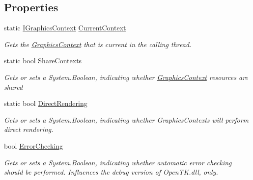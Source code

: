\subsection*{Properties}
\begin{DoxyCompactItemize}
\item 
static \hyperlink{interface_open_t_k_1_1_graphics_1_1_i_graphics_context}{I\-Graphics\-Context} \hyperlink{class_open_t_k_1_1_graphics_1_1_graphics_context_aa6b95167a8733355270dbb5d7c319986}{Current\-Context}
\begin{DoxyCompactList}\small\item\em Gets the \hyperlink{class_open_t_k_1_1_graphics_1_1_graphics_context}{Graphics\-Context} that is current in the calling thread. \end{DoxyCompactList}\item 
static bool \hyperlink{class_open_t_k_1_1_graphics_1_1_graphics_context_a83e5259c2dd10556b3c485f2e8a00494}{Share\-Contexts}
\begin{DoxyCompactList}\small\item\em Gets or sets a System.\-Boolean, indicating whether \hyperlink{class_open_t_k_1_1_graphics_1_1_graphics_context}{Graphics\-Context} resources are shared\end{DoxyCompactList}\item 
static bool \hyperlink{class_open_t_k_1_1_graphics_1_1_graphics_context_a2c0431903a5da942e015be0847f070bb}{Direct\-Rendering}
\begin{DoxyCompactList}\small\item\em Gets or sets a System.\-Boolean, indicating whether Graphics\-Contexts will perform direct rendering.\end{DoxyCompactList}\item 
bool \hyperlink{class_open_t_k_1_1_graphics_1_1_graphics_context_a8ad06302403c5503b6ba954676523d90}{Error\-Checking}
\begin{DoxyCompactList}\small\item\em Gets or sets a System.\-Boolean, indicating whether automatic error checking should be performed. Influences the debug version of Open\-T\-K.\-dll, only. \end{DoxyCompactList}\item 

\end{DoxyCompactItemize}

